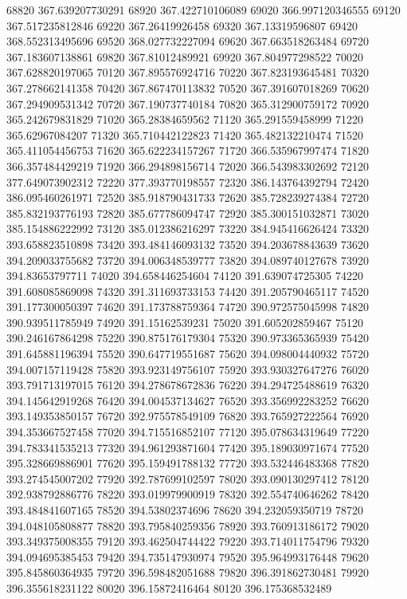 {68820 367.639207730291
68920 367.422710106089
69020 366.997120346555
69120 367.517235812846
69220 367.26419926458
69320 367.13319596807
69420 368.552313495696
69520 368.027732227094
69620 367.663518263484
69720 367.183607138861
69820 367.81012489921
69920 367.804977298522
70020 367.628820197065
70120 367.895576924716
70220 367.823193645481
70320 367.278662141358
70420 367.867470113832
70520 367.391607018269
70620 367.294909531342
70720 367.190737740184
70820 365.312900759172
70920 365.242679831829
71020 365.28384659562
71120 365.291559458999
71220 365.62967084207
71320 365.710442122823
71420 365.482132210474
71520 365.411054456753
71620 365.622234157267
71720 366.535967997474
71820 366.357484429219
71920 366.294898156714
72020 366.543983302692
72120 377.649073902312
72220 377.393770198557
72320 386.143764392794
72420 386.095460261971
72520 385.918790431733
72620 385.728239274384
72720 385.832193776193
72820 385.677786094747
72920 385.300151032871
73020 385.154886222992
73120 385.012386216297
73220 384.945416626424
73320 393.658823510898
73420 393.484146093132
73520 394.203678843639
73620 394.209033755682
73720 394.006348539777
73820 394.089740127678
73920 394.83653797711
74020 394.658446254604
74120 391.639074725305
74220 391.608085869098
74320 391.311693733153
74420 391.205790465117
74520 391.177300050397
74620 391.173788759364
74720 390.972575045998
74820 390.939511785949
74920 391.15162539231
75020 391.605202859467
75120 390.246167864298
75220 390.875176179304
75320 390.973365365939
75420 391.645881196394
75520 390.647719551687
75620 394.098004440932
75720 394.007157119428
75820 393.923149756107
75920 393.930327647276
76020 393.791713197015
76120 394.278678672836
76220 394.294725488619
76320 394.145642919268
76420 394.004537134627
76520 393.356992283252
76620 393.149353850157
76720 392.975578549109
76820 393.765927222564
76920 394.353667527458
77020 394.715516852107
77120 395.078634319649
77220 394.783341535213
77320 394.961293871604
77420 395.189030971674
77520 395.328669886901
77620 395.159491788132
77720 393.532446483368
77820 393.274545007202
77920 392.787699102597
78020 393.090130297412
78120 392.938792886776
78220 393.019979900919
78320 392.554740646262
78420 393.484841607165
78520 394.53802374696
78620 394.232059350719
78720 394.048105808877
78820 393.795840259356
78920 393.760913186172
79020 393.349375008355
79120 393.462504744422
79220 393.714011754796
79320 394.094695385453
79420 394.735147930974
79520 395.964993176448
79620 395.845860364935
79720 396.598482051688
79820 396.391862730481
79920 396.355618231122
80020 396.15872416464
80120 396.175368532489
}
